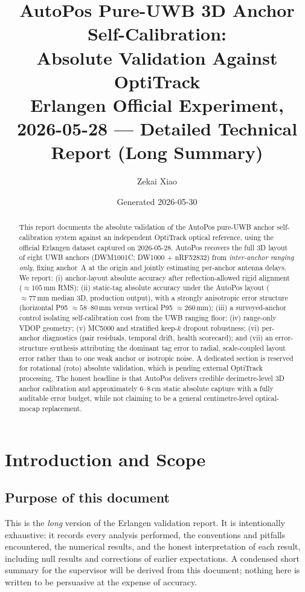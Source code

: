 \documentclass[11pt,a4paper]{article}
\title{\textbf{AutoPos Pure-UWB 3D Anchor Self-Calibration:\\
Absolute Validation Against OptiTrack\\[4pt]
\large Erlangen Official Experiment, 2026-05-28 --- Detailed Technical Report (Long Summary)}}
\author{Zekai Xiao}
\date{Generated 2026-05-30}
\newcommand{\mm}{\,\si{\milli\meter}}
\begin{document}
\maketitle
\thispagestyle{fancy}

\begin{abstract}
\noindent
This report documents the absolute validation of the AutoPos pure-UWB anchor
self-calibration system against an independent OptiTrack optical reference, using the
official Erlangen dataset captured on 2026-05-28. AutoPos recovers the full 3D layout of
eight UWB anchors (DWM1001C; DW1000 + nRF52832) from \emph{inter-anchor ranging only},
fixing anchor~A at the origin and jointly estimating per-anchor antenna delays. We report:
(i) anchor-layout absolute accuracy after reflection-allowed rigid alignment
($\approx\!105\mm$ RMS); (ii) static-tag absolute accuracy under the AutoPos layout
($\approx\!77\mm$ median 3D, production output), with a strongly anisotropic error
structure (horizontal P95 $\approx\!58$--$80\mm$ versus vertical P95 $\approx\!260\mm$);
(iii) a surveyed-anchor control isolating self-calibration cost from the UWB ranging floor;
(iv) range-only VDOP geometry; (v) MC5000 and stratified keep-$k$ dropout robustness;
(vi) per-anchor diagnostics (pair residuals, temporal drift, health scorecard); and
(vii) an error-structure synthesis attributing the dominant tag error to radial,
scale-coupled layout error rather than to one weak anchor or isotropic noise. A dedicated
section is reserved for rotational (roto) absolute validation, which is pending external
OptiTrack processing. The honest headline is that AutoPos delivers credible decimetre-level
3D anchor calibration and approximately $6$--$8\,\si{\centi\meter}$ static absolute capture
with a fully auditable error budget, while not claiming to be a general centimetre-level
optical-mocap replacement.
\end{abstract}

\tableofcontents
\clearpage

\section{Introduction and Scope}

\subsection{Purpose of this document}
This is the \emph{long} version of the Erlangen validation report. It is intentionally
exhaustive: it records every analysis performed, the conventions and pitfalls encountered,
the numerical results, and the honest interpretation of each result, including null results
and corrections of earlier expectations. A condensed short summary for the supervisor will
be derived from this document; nothing here is written to be persuasive at the expense of
accuracy.
\end{document}
